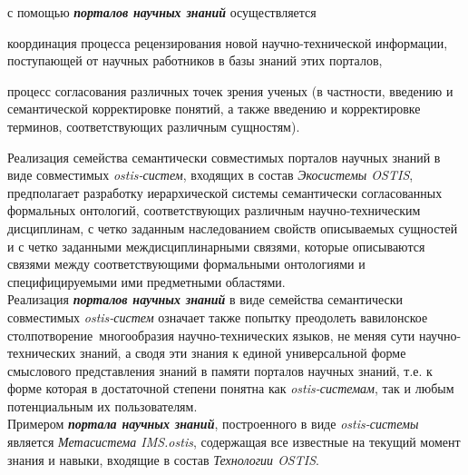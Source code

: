 \begin{SCn}
\begin{scnsubstruct}
{\begin{scnitemize}
            \item с помощью \textbf{\textit{порталов научных знаний}} осуществляется
            \begin{scnitemizeii}
                \item координация процесса рецензирования новой научно-технической информации, поступающей от научных работников в базы знаний этих порталов,
                \item процесс согласования различных точек зрения ученых (в частности, введению и семантической корректировке понятий, а также введению и корректировке терминов, соответствующих различным сущностям).
            \end{scnitemizeii}
        \end{scnitemize}
        Реализация семейства семантически совместимых порталов научных знаний в виде совместимых \textit{\mbox{ostis-систем}}, входящих в состав \textit{Экосистемы OSTIS}, предполагает разработку иерархической системы семантически согласованных формальных онтологий, соответствующих различным научно-техническим дисциплинам, с четко заданным наследованием свойств описываемых сущностей и с четко заданными междисциплинарными связями, которые описываются связями между соответствующими формальными онтологиями и специфицируемыми ими предметными областями.\\
        Реализация \textbf{\textit{порталов научных знаний}} в виде семейства семантически совместимых \textit{ostis-систем} означает также попытку преодолеть вавилонское столпотворение\ многообразия научно-технических языков, не меняя сути научно-технических знаний, а сводя эти знания к единой универсальной форме смыслового представления знаний в памяти порталов научных знаний, т.е. к форме которая в достаточной степени понятна как \textit{ostis-системам}, так и любым потенциальным их пользователям.\\
        Примером \textbf{\textit{портала научных знаний}}, построенного в виде \textit{ostis-системы} является \textit{Метасистема IMS.ostis}, содержащая все известные на текущий момент знания и навыки, входящие в состав \textit{Технологии OSTIS}.}
    \bigskip
    
    \end{scnsubstruct}
    \scnendcurrentsectioncomment
\end{SCn}
